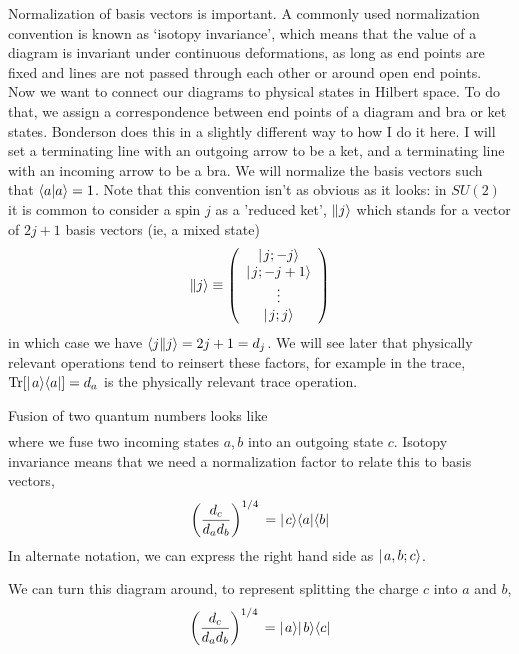\documentclass[12pt]{article}
\begin{document}
Normalization of basis vectors is important. A commonly used normalization convention
is known as `isotopy invariance', which means that the value of a diagram is invariant under continuous
deformations, as long as end points are fixed and lines are not passed through each other or around
open end points. Now we want to connect our diagrams to physical states in Hilbert space.
To do that, we assign a correspondence between end points of a diagram and bra or ket states.
Bonderson\cite{Bonderson} does this in a slightly different way to how I do it here.
I will set a terminating line with an outgoing arrow to be a ket, and a terminating line
with an incoming arrow to be a bra. We will normalize the basis vectors such that
$\langle a | a \rangle = 1$. Note that
this convention isn't as obvious as it looks: in $SU(2)$ it is common to consider a spin $j$ as a 
'reduced ket', $\| j \rangle$ which stands for a vector of $2j+1$ basis vectors (ie, a mixed state)
\begin{equation}
\| j \rangle \equiv \left( \begin{array}{c} \hbox{$\mid \! {j;-j} \rangle$} \\ \hbox{$\mid \! {j;-j+1} \rangle$} \\ \vdots
\\ \hbox{$\mid \! {j;j} \rangle$} \end{array} \right)
\end{equation}
in which case we have $\langle j \| j \rangle = 2j+1 = d_j$. 
We will see later that physically relevant operations tend to reinsert these factors, for
example in the trace, $\mathop{\rm Tr} [ \hbox{$\mid \! {a} \rangle$} \langle a | ] = d_a$ is the physically relevant trace operation.

Fusion of two quantum numbers looks like
\begin{equation}
\begin{gathered}

\end{gathered}
\end{equation}
where we fuse two incoming states $a,b$ into an outgoing state $c$. 
Isotopy invariance means that we need a normalization factor to relate this to basis vectors,
\begin{equation}
\left(\frac{d_c}{d_a d_b} \right)^{1/4}
\begin{gathered}

\end{gathered}
= \ket{c} \bra{a}\bra{b}
\end{equation}
In alternate notation, we can express the right hand side as $\hbox{$\mid \! {a,b;c} \rangle$}$.

We can turn this diagram around, to represent splitting the charge $c$ into $a$ and $b$,
\begin{equation}
\left(\frac{d_c}{d_a d_b} \right)^{1/4}
\begin{gathered}

\end{gathered}
= \ket{a}\ket{b} \bra{c}
\end{equation}
\end{document}
